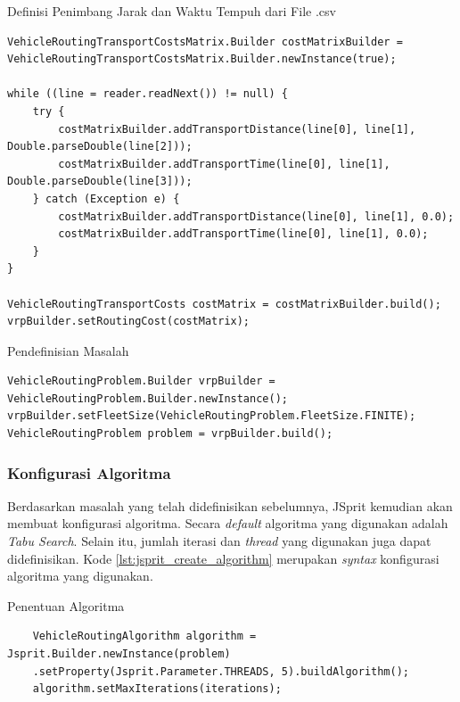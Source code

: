 \begin{listing}[!]
	\caption{Definisi Penimbang Jarak dan Waktu Tempuh dari File .csv}
	\label{lst:jsprit_define_route_weights}
	\begin{verbatim}
VehicleRoutingTransportCostsMatrix.Builder costMatrixBuilder = VehicleRoutingTransportCostsMatrix.Builder.newInstance(true);

while ((line = reader.readNext()) != null) {
	try {
		costMatrixBuilder.addTransportDistance(line[0], line[1], Double.parseDouble(line[2]));
		costMatrixBuilder.addTransportTime(line[0], line[1], Double.parseDouble(line[3]));
	} catch (Exception e) {
		costMatrixBuilder.addTransportDistance(line[0], line[1], 0.0);
		costMatrixBuilder.addTransportTime(line[0], line[1], 0.0);
	}
}

VehicleRoutingTransportCosts costMatrix = costMatrixBuilder.build();
vrpBuilder.setRoutingCost(costMatrix);
	\end{verbatim}
\end{listing}


\begin{listing}[!]
	\caption{Pendefinisian Masalah}
	\label{lst:jsprit_build_problem}
	\begin{verbatim}
VehicleRoutingProblem.Builder vrpBuilder = VehicleRoutingProblem.Builder.newInstance();
vrpBuilder.setFleetSize(VehicleRoutingProblem.FleetSize.FINITE);
VehicleRoutingProblem problem = vrpBuilder.build();
	\end{verbatim}
\end{listing}


\subsubsection{Konfigurasi Algoritma}
Berdasarkan masalah yang telah didefinisikan sebelumnya, JSprit kemudian akan membuat konfigurasi algoritma. Secara \textit{default} algoritma yang digunakan adalah \textit{Tabu Search}. Selain itu, jumlah iterasi dan \textit{thread} yang digunakan juga dapat didefinisikan. Kode \ref{lst:jsprit_create_algorithm} merupakan \textit{syntax} konfigurasi algoritma yang digunakan. 


\begin{listing}[!]
	\caption{Penentuan Algoritma}
	\label{lst:jsprit_create_algorithm}
	\begin{verbatim}
	VehicleRoutingAlgorithm algorithm = Jsprit.Builder.newInstance(problem)
	.setProperty(Jsprit.Parameter.THREADS, 5).buildAlgorithm();
	algorithm.setMaxIterations(iterations);
	\end{verbatim}
\end{listing}


